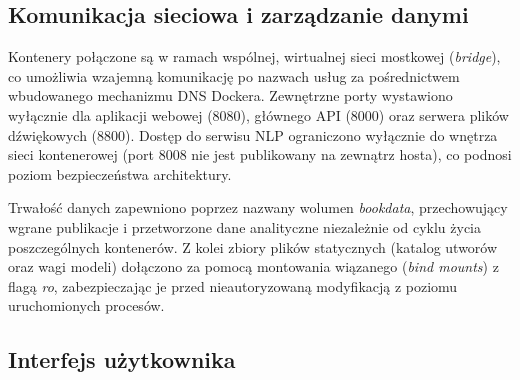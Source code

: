 \subsection{Komunikacja sieciowa i zarządzanie danymi}
Kontenery połączone są w ramach wspólnej, wirtualnej sieci mostkowej
(\textit{bridge}), co umożliwia wzajemną komunikację po nazwach usług za
pośrednictwem wbudowanego mechanizmu DNS Dockera. Zewnętrzne porty
wystawiono wyłącznie dla aplikacji webowej (8080), głównego API (8000) 
oraz serwera plików dźwiękowych (8800). Dostęp do serwisu NLP ograniczono
wyłącznie do wnętrza sieci kontenerowej (port 8008 nie jest publikowany
na zewnątrz hosta), co podnosi poziom bezpieczeństwa architektury.

Trwałość danych zapewniono poprzez nazwany wolumen \textit{bookdata},
przechowujący wgrane publikacje i przetworzone dane analityczne
niezależnie od cyklu życia poszczególnych kontenerów. Z kolei zbiory
plików statycznych (katalog utworów oraz wagi modeli) dołączono za pomocą
montowania wiązanego (\textit{bind mounts}) z flagą \textit{ro},
zabezpieczając je przed nieautoryzowaną modyfikacją z poziomu
uruchomionych procesów.

\subsection{Interfejs użytkownika}

